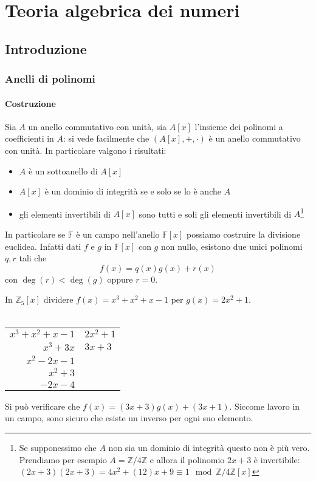 \part{Teoria algebrica dei numeri}
\chapter{Introduzione}
\section{Anelli di polinomi}
\subsection{Costruzione}



\label{lezione14}
Sia $A$ un anello commutativo con unità, sia $A[x]$ l'insieme dei polinomi a coefficienti in $A$: si vede facilmente che $\left(A[x],+,\cdot\right)$ è un anello commutativo con unità. In particolare valgono i risultati:
\begin{itemize}
	\item $A$ è un sottoanello di $A[x]$
	\item $A[x]$ è un dominio di integrità se e solo se lo è anche $A$
	\item gli elementi invertibili di $A[x]$ sono tutti e soli gli elementi invertibili di $A$\footnote{Se supponessimo che $A$ non sia un dominio di integrità questo non è più vero. Prendiamo per esempio $A = \mathbb{Z}/4\mathbb{Z}$ e allora il polinomio $2x+3$ è invertibile: $(2x+3)(2x+3) = 4x^2 + (12)x + 9 \equiv 1 \mod \mathbb{Z}/4\mathbb{Z}\left[x\right]$}
\end{itemize}
In particolare se $\mathbb{F}$ è un campo nell'anello $\mathbb{F}[x]$ possiamo costruire la divisione euclidea. Infatti dati $f$ e $g$ in $\mathbb{F}[x]$ con $g$ non nullo, esistono due unici polinomi $q,r$ tali che 
\begin{equation*}
f(x)=q(x)g(x)+r(x)
\end{equation*}
con $\deg(r)<\deg(g)$ oppure $r=0$. 
\begin{esempio}
	In $\mathbb{Z}_5[x]$ dividere $f(x)=x^3+x^2+x-1$ per $g(x)=2x^2+1$.\\ \\
	\begin{center}
		\begin{tabular}{r|r}
			$x^3+x^2+x-1$ & \multicolumn{1}{l}{$2x^2+1$}  \\ 
			\cline{2-2}
			$x^3+3x$      & \multicolumn{1}{l}{$3x+3$}    \\ 
			\cline{1-1}
			$x^2-2x-1$    &                               \\
			$x^2+3$       &                               \\ 
			\cline{1-1}
			$-2x-4$       &                              
		\end{tabular}
	\end{center}
	Si può verificare che $f(x)=(3x+3)g(x)+(3x+1)$. Siccome lavoro in un campo, sono sicuro che esiste un inverso per ogni suo elemento.
\end{esempio}
